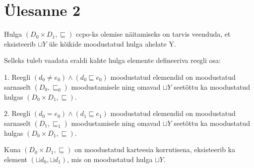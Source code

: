 \section{Ülesanne 2}

Hulga \((D_0 \times D_1, \sqsubseteq )\) ccpo-ks olemise näitamiseks on tarvis
veenduda, et eksisteerib \(\sqcup Y \) üle kõikide moodustatud hulga ahelate Y.

Selleks tuleb vaadata eraldi kahte hulga elemente defineeriva reegli osa:

1. Reegli \( (d_0 \neq e_0) \wedge (d_0 \sqsubseteq e_0) \) moodustatud elemendid
on moodustatud sarnaselt \((D_0, \sqsubseteq_0)\) moodustamisele ning omavad
\(\sqcup Y \) seetõttu ka moodustatud hulgas \((D_0 \times D_1, \sqsubseteq )\).

2. Reegli \( (d_0 = e_0) \wedge (d_1 \sqsubseteq e_1) \) moodustatud elemendid
on moodustatud sarnaselt \((D_1, \sqsubseteq_1)\) moodustamisele ning omavad
\(\sqcup Y \) seetõttu ka moodustatud hulgas \((D_0 \times D_1, \sqsubseteq )\).

Kuna \((D_0 \times D_1, \sqsubseteq )\) on moodustatud karteesia korrutisena,
eksisteerib ka element \( (\sqcup d_0, \sqcup d_1 ) \), mis on moodustatud hulga
\(\sqcup Y \).
